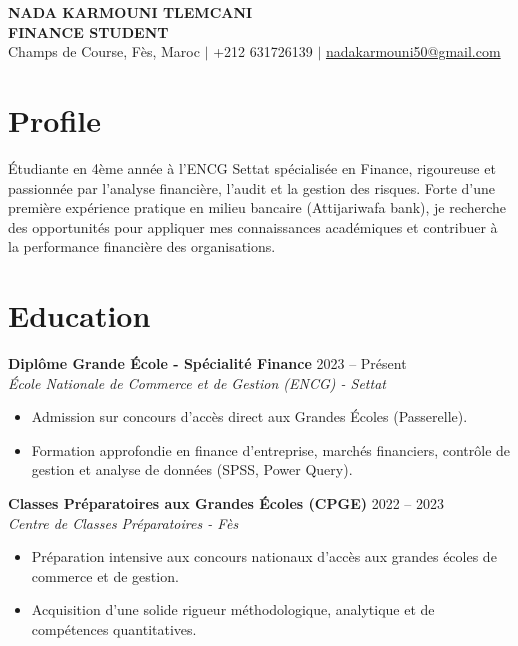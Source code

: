 \documentclass[10pt,a4paper]{article}
\begin{document}
\begin{center}
    {\Huge \bfseries NADA KARMOUNI TLEMCANI} \\[4pt]
    \textbf{FINANCE STUDENT} \\[4pt]
    Champs de Course, Fès, Maroc $|$ +212 631726139 $|$ \href{mailto:nadakarmouni50@gmail.com}{nadakarmouni50@gmail.com}
\end{center}

\section*{Profile}
Étudiante en 4ème année à l'ENCG Settat spécialisée en Finance, rigoureuse et passionnée par l'analyse financière, l'audit et la gestion des risques. Forte d'une première expérience pratique en milieu bancaire (Attijariwafa bank), je recherche des opportunités pour appliquer mes connaissances académiques et contribuer à la performance financière des organisations.

\section*{Education}

\textbf{Diplôme Grande École - Spécialité Finance} \hfill 2023 -- Présent \\
\textit{École Nationale de Commerce et de Gestion (ENCG) - Settat}
\begin{itemize}
    \item Admission sur concours d'accès direct aux Grandes Écoles (Passerelle).
    \item Formation approfondie en finance d'entreprise, marchés financiers, contrôle de gestion et analyse de données (SPSS, Power Query).
\end{itemize}

\vspace{4pt}

\textbf{Classes Préparatoires aux Grandes Écoles (CPGE)} \hfill 2022 -- 2023 \\
\textit{Centre de Classes Préparatoires - Fès}
\begin{itemize}
    \item Préparation intensive aux concours nationaux d'accès aux grandes écoles de commerce et de gestion.
    \item Acquisition d'une solide rigueur méthodologique, analytique et de compétences quantitatives.
\end{itemize}
\end{document}
